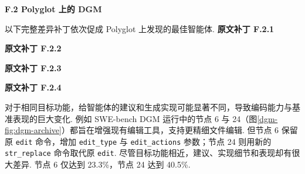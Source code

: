 \noindent\textbf{F.2 Polyglot 上的 DGM}\label{dgm-app:best-agent-dgm-polyglot}\par
以下完整差异补丁依次促成 Polyglot 上发现的最佳智能体.
\noindent\textbf{原文补丁 F.2.1}\label{dgm-snippet-polyglot-diff0}\par
{}
\noindent\textbf{原文补丁 F.2.2}\label{dgm-snippet-polyglot-diff1}\par
{}
\noindent\textbf{原文补丁 F.2.3}\label{dgm-snippet-polyglot-diff2}\par
{}
\noindent\textbf{原文补丁 F.2.4}\label{dgm-snippet-polyglot-diff3}\par
{}
对于相同目标功能，给智能体的建议和生成实现可能显著不同，导致编码能力与基准表现的巨大变化. 例如 SWE-bench DGM 运行中的节点 6 与 24（图\ref{dgm-fig:dgm-archive}）都旨在增强现有编辑工具，支持更精细文件编辑. 但节点 6 保留原 \texttt{edit} 命令，增加 \texttt{edit\_type} 与 \texttt{edit\_actions} 参数；节点 24 则用新的 \texttt{str\_replace} 命令取代原 \texttt{edit}. 尽管目标功能相近，建议、实现细节和表现却有很大差异. 节点 6 仅达到 23.3\%，节点 24 达到 40.5\%.


